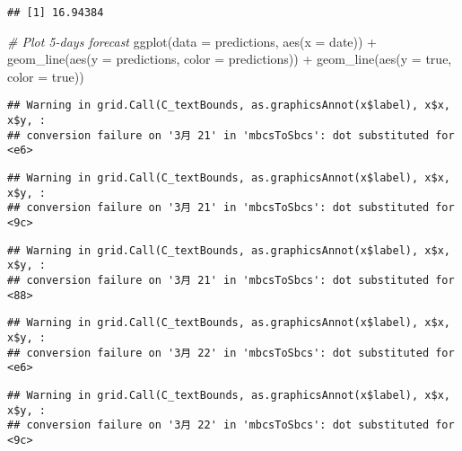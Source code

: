 \documentclass[
]{article}
\newenvironment{Shaded}{\begin{snugshade}}{\end{snugshade}}
\newcommand{\AttributeTok}[1]{\textcolor[rgb]{0.77,0.63,0.00}{#1}}
\newcommand{\CommentTok}[1]{\textcolor[rgb]{0.56,0.35,0.01}{\textit{#1}}}
\newcommand{\FunctionTok}[1]{\textcolor[rgb]{0.00,0.00,0.00}{#1}}
\newcommand{\NormalTok}[1]{#1}
\newcommand{\SpecialCharTok}[1]{\textcolor[rgb]{0.00,0.00,0.00}{#1}}
\newcommand{\StringTok}[1]{\textcolor[rgb]{0.31,0.60,0.02}{#1}}
\begin{document}
\begin{verbatim}
## [1] 16.94384
\end{verbatim}

\begin{Shaded}
\begin{Highlighting}[]
\CommentTok{\# Plot 5{-}days forecast}
\FunctionTok{ggplot}\NormalTok{(}\AttributeTok{data =}\NormalTok{ predictions, }\FunctionTok{aes}\NormalTok{(}\AttributeTok{x =}\NormalTok{ date)) }\SpecialCharTok{+}
  \FunctionTok{geom\_line}\NormalTok{(}\FunctionTok{aes}\NormalTok{(}\AttributeTok{y =}\NormalTok{ predictions, }\AttributeTok{color =} \StringTok{\textquotesingle{}predictions\textquotesingle{}}\NormalTok{)) }\SpecialCharTok{+}
  \FunctionTok{geom\_line}\NormalTok{(}\FunctionTok{aes}\NormalTok{(}\AttributeTok{y =}\NormalTok{ true, }\AttributeTok{color =} \StringTok{\textquotesingle{}true\textquotesingle{}}\NormalTok{))}
\end{Highlighting}
\end{Shaded}

\begin{verbatim}
## Warning in grid.Call(C_textBounds, as.graphicsAnnot(x$label), x$x, x$y, :
## conversion failure on '3月 21' in 'mbcsToSbcs': dot substituted for <e6>
\end{verbatim}

\begin{verbatim}
## Warning in grid.Call(C_textBounds, as.graphicsAnnot(x$label), x$x, x$y, :
## conversion failure on '3月 21' in 'mbcsToSbcs': dot substituted for <9c>
\end{verbatim}

\begin{verbatim}
## Warning in grid.Call(C_textBounds, as.graphicsAnnot(x$label), x$x, x$y, :
## conversion failure on '3月 21' in 'mbcsToSbcs': dot substituted for <88>
\end{verbatim}

\begin{verbatim}
## Warning in grid.Call(C_textBounds, as.graphicsAnnot(x$label), x$x, x$y, :
## conversion failure on '3月 22' in 'mbcsToSbcs': dot substituted for <e6>
\end{verbatim}

\begin{verbatim}
## Warning in grid.Call(C_textBounds, as.graphicsAnnot(x$label), x$x, x$y, :
## conversion failure on '3月 22' in 'mbcsToSbcs': dot substituted for <9c>
\end{verbatim}
\end{document}
